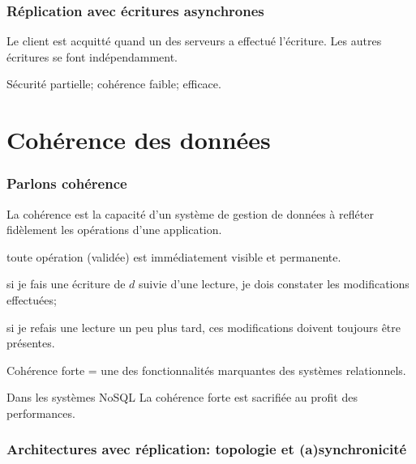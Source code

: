 \begin{frame}
\frametitle{Réplication avec écritures asynchrones}

Le client est acquitté quand \alert{un} des serveurs a effectué l'écriture. Les autres
écritures se font indépendamment.

\vfill


\vfill

Sécurité partielle; cohérence faible; \alert{efficace}.

\end{frame}

\section{Cohérence des données}


\begin{frame}
\frametitle{Parlons cohérence}

La cohérence est la capacité d’un système de gestion de données à refléter fidèlement les opérations d’une application.
 
\begin{redbullet}
  \item toute opération (validée) est immédiatement visible et permanente. 
  \item si je fais une écriture de $d$ suivie d’une lecture, je dois constater les modifications effectuées; 
  \item si je refais une lecture un peu plus tard, ces modifications doivent toujours être présentes.
\end{redbullet}

\alert{Cohérence forte = } une des fonctionnalités marquantes des systèmes relationnels.

\begin{remblock}{Dans les systèmes NoSQL}
\alert{La cohérence forte est sacrifiée au profit des performances.} 
\end{remblock}
\end{frame}

\begin{frame}
\frametitle{Architectures avec réplication: topologie et (a)synchronicité}


\end{frame}

